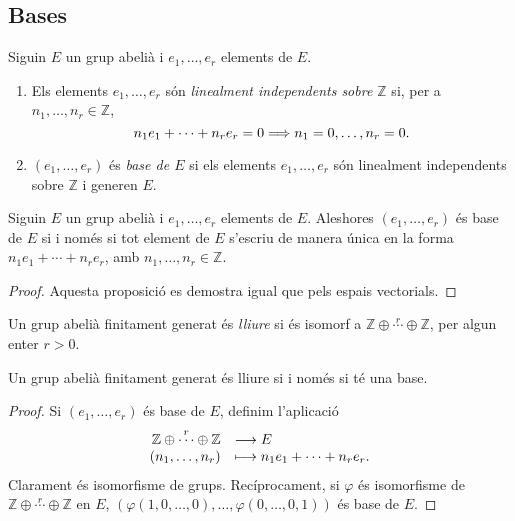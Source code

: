 \documentclass[../main.tex]{subfiles}
\begin{document}
\subsection{Bases}
\begin{defi}
Siguin $E$ un grup abelià i $e_1,\ldots,e_r$ elements de $E$.
\begin{enumerate}[1)]
    \item Els elements $e_1,\ldots,e_r$ són \textit{linealment independents sobre $\mathbb{Z}$} si, per a $n_1,\ldots,n_r\in\mathbb{Z}$,
    \begin{equation}
        \notag
        n_1e_1+\cdots+n_re_r = 0 \Longrightarrow n_1 = 0,\ldots, n_r = 0.
    \end{equation}
    \item $(e_1,\ldots,e_r)$ és \textit{base de $E$} si els elements $e_1,\ldots,e_r$ són linealment independents sobre $\mathbb{Z}$ i generen $E$.
\end{enumerate}
\end{defi}

\begin{prop}
Siguin $E$ un grup abelià i $e_1,\ldots,e_r$ elements de $E$. Aleshores $(e_1, \ldots, e_r)$ és base de $E$ si i només si tot element de $E$ s'escriu de manera única en la forma $n_1e_1+\cdots+n_re_r$, amb $n_1,\ldots,n_r\in \mathbb{Z}$.
\end{prop}
\begin{proof}
Aquesta proposició es demostra igual que pels espais vectorials.
\end{proof}

\begin{defi}
Un grup abelià finitament generat és \textit{lliure} si és isomorf a $\mathbb{Z}\oplus\overset{r}{\cdots}\oplus\mathbb{Z}$, per algun enter $r>0$.
\end{defi}

\begin{prop}
Un grup abelià finitament generat és lliure si i només si té una base.
\end{prop}
\begin{proof}
Si $(e_1,\ldots,e_r)$ és base de $E$, definim l'aplicació
\begin{equation}
    \notag
    \begin{array}{rl}
        \mathbb{Z}\oplus\overset{r}{\cdots}\oplus\mathbb{Z} & \longrightarrow E \\
        (n_1,\ldots,n_r) & \longmapsto n_1e_1+\cdots+n_re_r.
    \end{array}
\end{equation}
Clarament és isomorfisme de grups. Recíprocament, si $\varphi$ és isomorfisme de $\mathbb{Z}\oplus\overset{r}{\cdots}\oplus\mathbb{Z}$ en $E$, $(\varphi(1,0,\ldots,0),\ldots,\varphi(0,\ldots,0,1))$ és base de $E$.
\end{proof}
\end{document}
